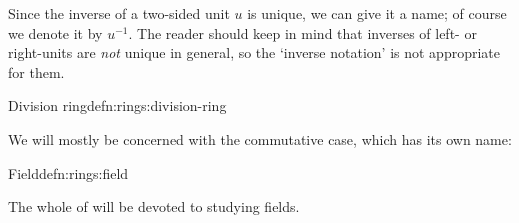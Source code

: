 Since the inverse of a two-sided unit $u$ is unique, we can give it a
name; of course we denote it by $u^{-1}$. The reader should keep in
mind that inverses of left- or right-units are \emph{not} unique in
general, so the `inverse notation' is not appropriate for them.
\begin{defn}{Division ring}{defn:rings:division-ring}
\end{defn}
We will mostly be concerned with the commutative case, which has its
own name:
\begin{defn}{Field}{defn:rings:field}
\end{defn}
The whole of  will be devoted to studying fields.

